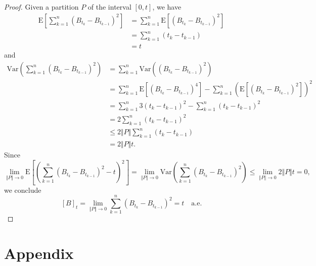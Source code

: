 \documentclass{article}
\theoremstyle{nonumberplain}
\newtheorem{proof}{Proof.}
\begin{document}
\begin{proof} 
	Given a partition $P$ of the interval $[0,t]$, we have
	\[
	\begin{aligned}
	\mathrm{E}\left[\sum _{k=1}^{n}(B_{t_{k}}-B_{t_{k-1}})^{2}\right]&=\sum _{k=1}^{n}\mathrm{E}\left[(B_{t_{k}}-B_{t_{k-1}})^{2}\right]\\
	&=\sum _{k=1}^{n}(t_{k}-t_{k-1})\\
	&=t
    \end{aligned}
    \]
    and
    \[
    \begin{aligned}
	\mathrm{Var}\left(\sum _{k=1}^{n}(B_{t_{k}}-B_{t_{k-1}})^{2}\right)&=\sum _{k=1}^{n}\mathrm{Var}\left((B_{t_{k}}-B_{t_{k-1}})^{2}\right)\\
	&=\sum _{k=1}^{n}\mathrm{E}\left[(B_{t_{k}}-B_{t_{k-1}})^{4}\right]-\sum _{k=1}^{n}\left(\mathrm{E}\left[\left(B_{t_{k}}-B_{t_{k-1}}\right)^{2}\right]\right)^{2}\\
	&=\sum_{k=1}^{n}3(t_{k}-t_{k-1})^2-\sum _{k=1}^{n}\left(t_{k}-t_{k-1}\right)^{2}\\
	&=2\sum_{k=1}^{n}(t_{k}-t_{k-1})^2\\
	&\le 2\Vert P\Vert\sum_{k=1}^{n}(t_{k}-t_{k-1})\\
	&= 2\Vert P\Vert t.
	\end{aligned}
	\]
	Since
	\[
	\lim\limits_{\Vert P\Vert\to0 }\mathrm{E}\left[\left(\sum _{k=1}^{n}(B_{t_{k}}-B_{t_{k-1}})^{2}-t\right)^2\right]=\lim\limits_{\Vert P\Vert \to0}\mathrm{Var}\left(\sum _{k=1}^{n}(B_{t_{k}}-B_{t_{k-1}})^{2}\right)\le \lim\limits_{\Vert P\Vert\to0 }2\Vert P\Vert t=0,
	\]
	we conclude 
	\[
	[B]_t=\lim_{\Vert P\Vert \rightarrow 0}\sum _{k=1}^{n}(B_{t_{k}}-B_{t_{k-1}})^{2}=t\quad\text{a.e.}
	\]
\end{proof}
\newpage

\section*{Appendix}
\end{document}
